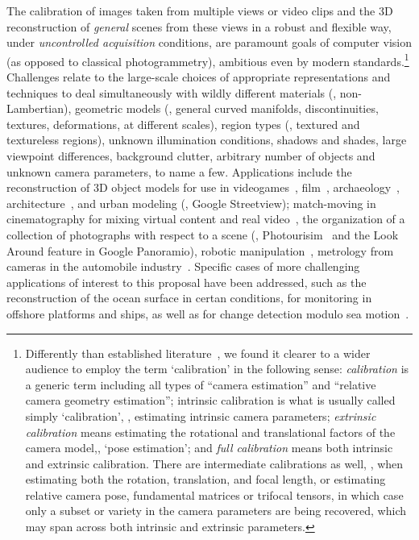 The calibration of images taken from multiple views or
video clips and the 3D reconstruction of \emph{general} scenes from these views in a
robust and flexible way, under \emph{uncontrolled acquisition} conditions, are 
paramount goals of computer vision (as opposed to classical photogrammetry),
ambitious even by modern standards.\footnote{Differently than established
literature~\cite{Hartley:Zisserman:book}, we
found it clearer to a wider audience to employ the term `calibration' in the following sense:
\emph{calibration} is a generic term including all types of ``camera estimation'' and ``relative camera geometry estimation'';
intrinsic calibration is what is usually called simply `calibration', \ie, 
estimating intrinsic camera parameters; 
\emph{extrinsic calibration} means estimating the rotational and translational factors
of the camera model,\ie, `pose estimation'; and \emph{full calibration} means both intrinsic
and extrinsic calibration. There are intermediate calibrations as well, \eg, when estimating both the
rotation, translation, and focal length, or estimating relative
camera pose, fundamental matrices or trifocal tensors, in which case only a
subset or variety in the camera parameters are being recovered, which may span across both
intrinsic and extrinsic parameters.}
%
Challenges relate to the large-scale
choices of appropriate representations and techniques to deal simultaneously
with wildly different materials (\eg, non-Lambertian), geometric models (\eg,
general curved manifolds, discontinuities, textures, deformations, at different
scales), region types (\eg, textured and textureless regions), unknown
illumination conditions, shadows and shades, large viewpoint differences,
background clutter, arbitrary number of objects and unknown camera parameters,
to name a few.  
%
Applications include the reconstruction of 3D object models for use in
videogames~\cite{Ablan:3DPhoto:book},
film~\cite{Ablan:3DPhoto:book,Kitagawa:Mocap:book},
archaeology~\cite{Gay:etal:ACVA10,Luhmann:Photogrammetry:book},
architecture~\cite{Luhmann:Photogrammetry:book}, and urban modeling (\eg,
Google Streetview); match-moving in cinematography for mixing virtual content
and real video~\cite{Dobbert:Matchmoving:book}, the organization of a
collection of photographs with respect to a scene (\eg,
Photourisim~\cite{Argarwal:Snavely:etal:ICCV09} and the Look Around feature in
Google Panoramio), robotic manipulation~\cite{Horn:Robot:Vision}, metrology
from cameras in the automobile industry~\cite{Luhmann:Photogrammetry:book}.
Specific cases of more challenging applications of interest to this proposal
have been addressed, such as the reconstruction of the ocean surface in certan
conditions, for monitoring in offshore platforms and ships, as well as for
change detection modulo sea
motion~\cite{Benetazzo:CE2006,Benetazzo:CE2012,Gallego:etal:TGRS201,Fedele:etal:OM2013,Fedele:etal:MCS2012,Benetazzo:etal:CE2016,Gallego:etal:TIP2013,Bergamasco:etal:CG2016,Rapizo:etal:JCR2015,Fabbri:WaterWaves2016,Fabbri:WaterWaves2017,Souza:Fabbri:WaterWaves2017}.

